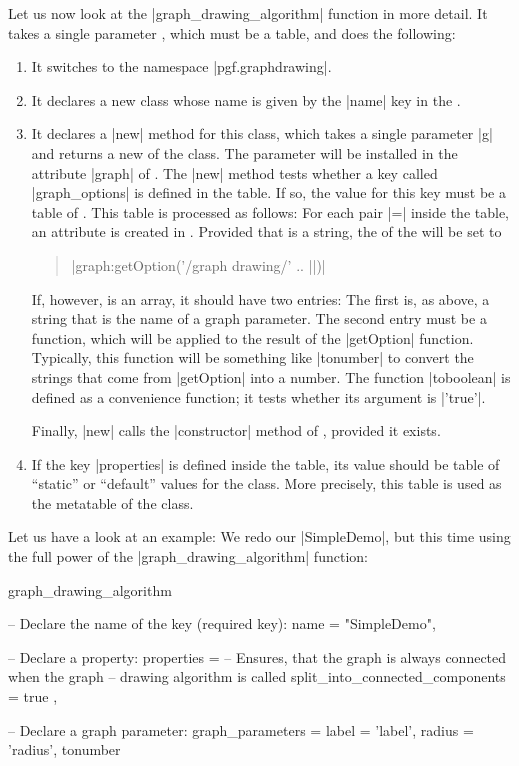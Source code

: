 Let us now look at the |graph_drawing_algorithm| function in more
detail. It takes a single parameter , which must be a
table, and does the following:

\begin{enumerate}
\item It switches to the namespace |pgf.graphdrawing|.
\item It declares a new class whose name is given by the |name| key in
  the .
\item It declares a |new| method for this class, which takes a single
  parameter |g| and returns a new  of the class. The
  parameter will be installed in the attribute |graph| of
  . The |new| method tests whether a key called
  |graph_options| is defined in the  table. If so, the
  value for this key must be a table of . This table is
  processed as follows: For each pair  |=| 
  inside the  table, an attribute  is created
  in . Provided that  is a string, the
   of the  will be set to
  \begin{quote}
    |graph:getOption('/graph drawing/' .. ||)|
  \end{quote}
  If, however,  is an array, it should have two entries:
  The first is, as above, a string that is the name of a graph
  parameter. The second entry must be a function, which will be
  applied to the result of the |getOption| function. Typically, this
  function will be something like |tonumber| to convert the strings
  that come from |getOption| into a number. The function |toboolean|
  is defined as a convenience function; it tests whether its argument
  is |'true'|.

  Finally, |new| calls the |constructor| method of ,
  provided it exists.   
\item If the key |properties| is defined inside the  table,
  its value should be table of ``static'' or ``default'' values for
  the class. More precisely, this table is used as the metatable of
  the class.
\end{enumerate}

Let us have a look at an example: We redo our |SimpleDemo|, but this
time using the full power of the |graph_drawing_algorithm| function:

\begin{codeexample}
graph_drawing_algorithm {
  
  -- Declare the name of the key (required key):
  name = "SimpleDemo",

  -- Declare a property:
  properties = {
    -- Ensures, that the graph is always connected when the graph
    -- drawing algorithm is called
    split_into_connected_components = true
  },

  -- Declare a graph parameter:
  graph_parameters = {
    label  = 'label',
    radius = {'radius', tonumber}
  }
}
\end{codeexample}

